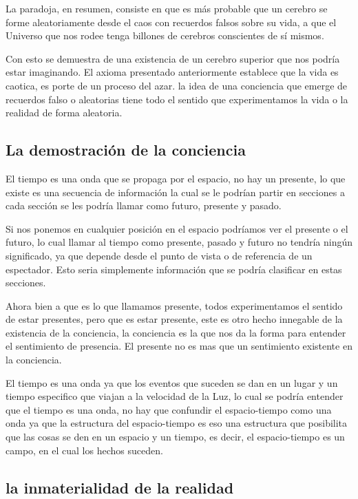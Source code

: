 \documentclass[12pt,letterpaper, a4paper ]{article}
\begin{document}
La paradoja, en resumen, consiste en que es más probable que un cerebro se forme aleatoriamente desde el caos con recuerdos falsos sobre su vida, a que el Universo que nos rodee tenga billones de cerebros conscientes de sí mismos.

Con esto se demuestra de una existencia de un cerebro superior que nos podría estar imaginando. El axioma presentado anteriormente establece que la vida es caotica, es porte de un proceso del azar. la idea de una conciencia que emerge de recuerdos falso o aleatorias tiene todo el sentido que experimentamos la vida o la realidad de forma aleatoria.


\subsection{La demostración de la conciencia}

El tiempo es una onda que se propaga por el espacio, no hay un presente, lo que existe es una secuencia de información la cual se le podrían partir en secciones a cada sección se les podría llamar como futuro, presente y pasado.

Si nos ponemos en cualquier posición en el espacio podríamos ver el presente o el futuro, lo cual llamar al tiempo como presente, pasado y futuro no tendría ningún significado, ya que depende desde el punto de vista o de referencia de un espectador.
Esto seria simplemente información que se podría clasificar en estas secciones.


Ahora bien a que es lo que llamamos presente, todos experimentamos el sentido de estar presentes, pero que es estar presente, este es otro hecho innegable de la existencia de la conciencia, la conciencia es la que nos da
la forma para entender el sentimiento de presencia. El presente no es mas que un sentimiento existente en la conciencia.

El tiempo es una onda ya que los eventos que suceden se dan en un lugar y un tiempo especifico que viajan a la velocidad de la Luz, lo cual se podría entender que el tiempo es una onda, no hay que confundir el espacio-tiempo como una onda
ya que la estructura del espacio-tiempo es eso una estructura que posibilita que las cosas se den en un espacio y un tiempo, es decir, el espacio-tiempo es un campo, en el cual los hechos suceden.

\subsection{la inmaterialidad de la realidad}
\end{document}
